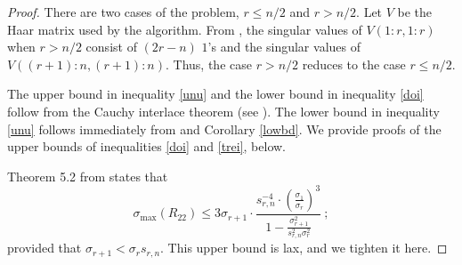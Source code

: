 \documentclass{article}
\theoremstyle{definition}
\newcommand{\smin}{s_{r,n}}
\begin{document}
\begin{proof} There are two cases of the problem, $r \leq n/2$ and $r> n/2$. 
Let $V$ be the Haar matrix used by the algorithm. 
From \cite[Theorem 2.4-1]{golubvanloan}, 
the singular values of $V(1:r, 1:r)$ when $r>n/2$ consist 
of $(2r-n)$ $1$'s and the singular values of $V((r+1):n ,(r+1):n)$. 
Thus, the case $r>n/2$ reduces to the case $r \leq n/2$.


The upper bound in inequality \eqref{unu} and the lower bound in inequality \eqref{doi} follow from the Cauchy interlace theorem (see \cite[Theorem 7.3.9]{horn_johnson1}). 
The lower bound in inequality \eqref{unu} follows immediately from \cite[Theorem 5.2]{DDH07} and Corollary \ref{lowbd}.
We provide proofs of the upper bounds of inequalities \eqref{doi} and \eqref{trei}, below. 

Theorem 5.2 from \cite{DDH07} states that 
$$\sigma_{\max}(R_{22}) \leq 3\sigma_{r+1} \cdot \frac{\smin^{-4} \cdot \left ( \frac{\sigma_1}{\sigma_r} \right)^3}{1 - \frac{\sigma_{r+1}^2}{\smin^2 \sigma_r^2}}~;$$
provided that $\sigma_{r+1} < \sigma_r \smin$.
This upper bound is lax, and we tighten it here.


\end{proof}
\end{document}
